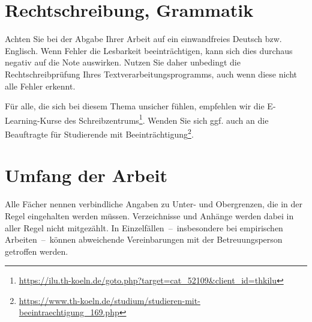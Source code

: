\section{Rechtschreibung, Grammatik}
Achten Sie bei der Abgabe Ihrer Arbeit auf ein einwandfreies Deutsch bzw. Englisch. Wenn Fehler die Lesbarkeit beeinträchtigen, kann sich dies durchaus negativ auf die Note auswirken. Nutzen Sie daher unbedingt die Rechtschreibprüfung Ihres Textverarbeitungsprogramms, auch wenn diese nicht alle Fehler erkennt.
\par
Für alle, die sich bei diesem Thema unsicher fühlen, empfehlen wir die E-Learning-Kurse des Schreibzentrums\footnote{\href{https://ilu.th-koeln.de/goto.php?target=cat\_52109\&client\_id=thkilu}{https://ilu.th-koeln.de/goto.php?target=cat\_52109\&client\_id=thkilu}}. Wenden Sie sich ggf. auch an die Beauftragte für Studierende mit Beeinträchtigung\footnote{\href{https://www.th-koeln.de/studium/studieren-mit-beeintraechtigung\_169.php}{https://www.th-koeln.de/studium/studieren-mit-beeintraechtigung\_169.php}}.
%
%
\section{Umfang der Arbeit}
Alle Fächer nennen verbindliche Angaben zu Unter- und Obergrenzen, die in der Regel eingehalten werden müssen. Verzeichnisse und Anhänge werden dabei in aller Regel nicht mitgezählt. In Einzelfällen~--~insbesondere bei empirischen Arbeiten~--~können abweichende Vereinbarungen mit der Betreuungsperson getroffen werden.